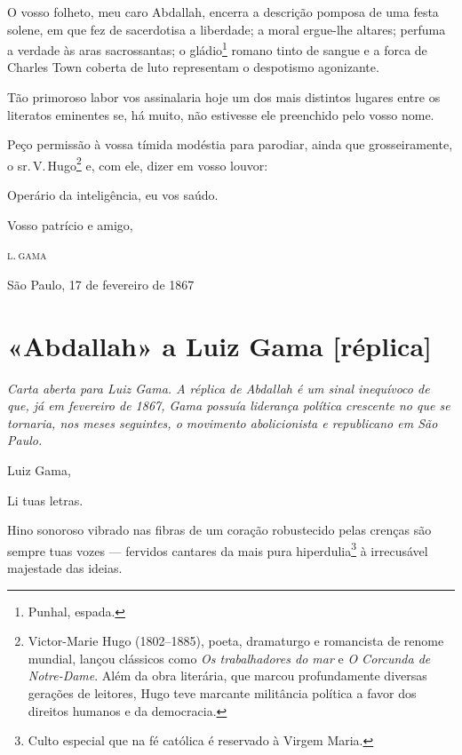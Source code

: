 O vosso folheto, meu caro Abdallah, encerra a descrição pomposa de uma
festa solene, em que fez de sacerdotisa a liberdade; a moral ergue-lhe
altares; perfuma a verdade às aras sacrossantas; o gládio\footnote{
  Punhal, espada.} romano tinto de sangue e a forca de Charles Town
coberta de luto representam o despotismo agonizante.

Tão primoroso labor vos assinalaria hoje um dos mais distintos lugares
entre os literatos eminentes se, há muito, não estivesse ele preenchido
pelo vosso nome.

Peço permissão à vossa tímida modéstia para parodiar, ainda que
grosseiramente, o sr.\,V.\,Hugo\footnote{Victor-Marie Hugo (1802--1885),
  poeta, dramaturgo e romancista de renome mundial, lançou clássicos
  como \emph{Os trabalhadores do mar} e \emph{O Corcunda de Notre-Dame}.
  Além da obra literária, que marcou profundamente diversas gerações de
  leitores, Hugo teve marcante militância política a favor dos direitos
  humanos e da democracia.}\label{victor hugo} e, com ele, dizer em vosso louvor:

Operário da inteligência, eu vos saúdo.

\begin{flushright}
Vosso patrício e amigo,

\textsc{l.\,gama}

São Paulo, 17 de fevereiro de 1867
\end{flushright}


\section{«Abdallah» a Luiz Gama {[}réplica{]}\protect\footnotemark}


\begin{didascalia}\itshape
Carta aberta para Luiz Gama. A réplica de Abdallah é um sinal
inequívoco de que, já em fevereiro de 1867, Gama possuía liderança
política crescente no que se tornaria, nos meses seguintes, o movimento
abolicionista e republicano em São Paulo.
\end{didascalia}




Luiz Gama,

Li tuas letras.

Hino sonoroso vibrado nas fibras de um coração robustecido pelas crenças
são sempre tuas vozes --- fervidos cantares da mais pura
hiperdulia\footnote{Culto especial que na fé católica é reservado à
  Virgem Maria.} à irrecusável majestade das ideias.

